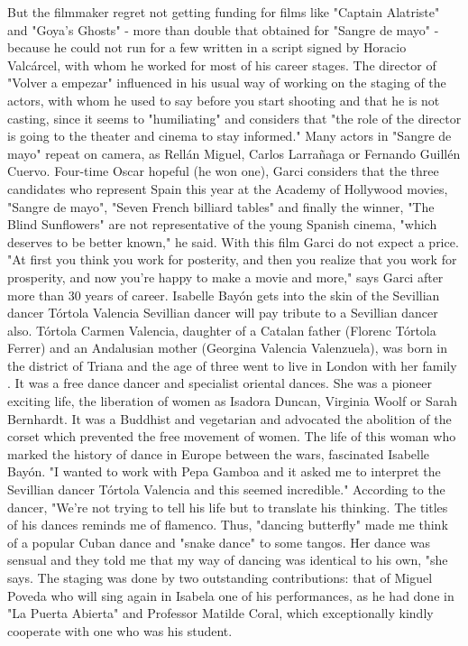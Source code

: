 But the filmmaker regret not getting funding for films like "Captain Alatriste" and "Goya's Ghosts" - more than double that obtained for "Sangre de mayo" - because he could not run for a few written in a script signed by Horacio Valcárcel, with whom he worked for most of his career stages.
The director of "Volver a empezar" influenced in his usual way of working on the staging of the actors, with whom he used to say before you start shooting and that he is not casting, since it seems to "humiliating" and considers that "the role of the director is going to the theater and cinema to stay informed."
Many actors in "Sangre de mayo" repeat on camera, as Rellán Miguel, Carlos Larrañaga or Fernando Guillén Cuervo.
Four-time Oscar hopeful (he won one), Garci considers that the three candidates who represent Spain this year at the Academy of Hollywood movies, "Sangre de mayo", "Seven French billiard tables" and finally the winner, "The Blind Sunflowers" are not representative of the young Spanish cinema, "which deserves to be better known," he said.
With this film Garci do not expect a price.
"At first you think you work for posterity, and then you realize that you work for prosperity, and now you're happy to make a movie and more," says Garci after more than 30 years of career.
Isabelle Bayón gets into the skin of the Sevillian dancer Tórtola Valencia
Sevillian dancer will pay tribute to a Sevillian dancer also.
Tórtola Carmen Valencia, daughter of a Catalan father (Florenc Tórtola Ferrer) and an Andalusian mother (Georgina Valencia Valenzuela), was born in the district of Triana and the age of three went to live in London with her family .
It was a free dance dancer and specialist oriental dances.
She was a pioneer exciting life, the liberation of women as Isadora Duncan, Virginia Woolf or Sarah Bernhardt.
It was a Buddhist and vegetarian and advocated the abolition of the corset which prevented the free movement of women.
The life of this woman who marked the history of dance in Europe between the wars, fascinated Isabelle Bayón.
"I wanted to work with Pepa Gamboa and it asked me to interpret the Sevillian dancer Tórtola Valencia and this seemed incredible."
According to the dancer, "We're not trying to tell his life but to translate his thinking.
The titles of his dances reminds me of flamenco.
Thus, "dancing butterfly" made me think of a popular Cuban dance and "snake dance" to some tangos.
Her dance was sensual and they told me that my way of dancing was identical to his own, "she says.
The staging was done by two outstanding contributions: that of Miguel Poveda who will sing again in Isabela one of his performances, as he had done in "La Puerta Abierta" and Professor Matilde Coral, which exceptionally kindly cooperate with one who was his student.
